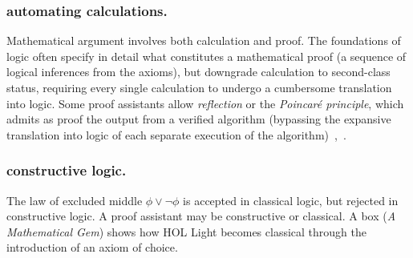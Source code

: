 \documentclass{llncs}
\begin{document}
\subsubsection{automating calculations.} Mathematical argument
involves both calculation and proof.  The foundations of logic often
specify in detail what constitutes a mathematical proof (a sequence of
logical inferences from the axioms), but downgrade calculation to
second-class status, requiring every single calculation to undergo a
cumbersome translation into logic.
Some proof assistants allow {\it reflection} or the {\it Poincar\'e
  principle}, which admits as proof the output from a verified
algorithm (bypassing the expansive translation into logic of each
separate execution of the algorithm)~\cite[p.~4]{HPSH},~\cite{BFM}.




\subsubsection{constructive logic.} The law of excluded middle
$\phi\lor\lnot \phi$ is accepted in classical logic, but rejected in
constructive logic.  A proof assistant may be constructive or
classical.  A box ({\it A Mathematical Gem}) shows how HOL Light
becomes classical through the introduction of an axiom of choice.

\newpage
\bigskip
\noindent
\end{document}
